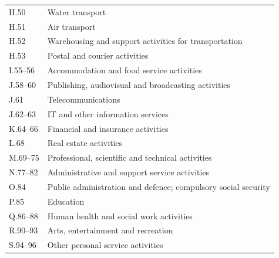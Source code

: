 \begin{longtable}{ll}
H.50 & Water transport \\
H.51 & Air transport \\
H.52 & Warehousing and support activities for transportation \\
H.53 & Postal and courier activities \\
I.55--56 & Accommodation and food service activities \\
J.58--60 & Publishing, audiovisual and broadcasting activities \\
J.61 & Telecommunications \\
J.62--63 & IT and other information services \\
K.64--66 & Financial and insurance activities \\
L.68 & Real estate activities \\
M.69--75 & Professional, scientific and technical activities \\
N.77--82 & Administrative and support service activities \\
O.84 & Public administration and defence; compulsory social security \\
P.85 & Education \\
Q.86--88 & Human health and social work activities \\
R.90--93 & Arts, entertainment and recreation \\
S.94--96 & Other personal service activities \\
\end{longtable}

\FloatBarrier
